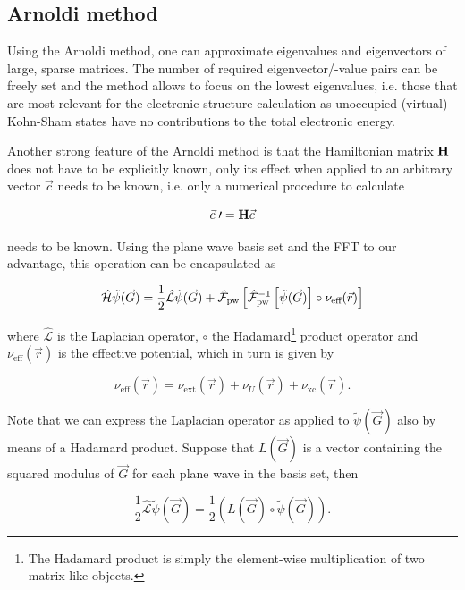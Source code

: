 %
%
%
\subsection{Arnoldi method}

Using the Arnoldi method, one can approximate eigenvalues and eigenvectors of large, sparse matrices. The number of required eigenvector/-value pairs can be freely set and the method allows to focus on the lowest eigenvalues, i.e. those that are most relevant for the electronic structure calculation as unoccupied (virtual) Kohn-Sham states have no contributions to the total electronic energy.

Another strong feature of the Arnoldi method is that the Hamiltonian matrix $\mathbf{H}$ does not have to be explicitly known, only its effect when applied to an arbitrary vector $\vec{c}$ needs to be known, i.e. only a numerical procedure to calculate

\begin{equation}
    \vec{c}\;\prime = \mathbf{H}\vec{c}
\end{equation}

needs to be known. Using the plane wave basis set and the FFT to our advantage, this operation can be encapsulated as

\begin{equation}
    \hat{\mathcal{H}}\tilde{\psi}(\vec{G}) = \frac{1}{2} \hat{\mathcal{L}}\tilde{\psi}(\vec{G}) + \hat{\mathcal{F}}_{\text{pw}}\left[\hat{\mathcal{F}}_{\text{pw}}^{-1}\left[\tilde{\psi}(\vec{G}) \right] \circ \nu_{\text{eff}}(\vec{r}) \right]
    \label{eq:appl_hamil}
\end{equation}

where $\hat{\mathcal{L}}$ is the Laplacian operator, $\circ$ the Hadamard\footnote{The Hadamard product is simply the element-wise multiplication of two matrix-like objects.} product operator and $\nu_{\text{eff}}(\vec{r})$ is the effective potential, which in turn is given by

\begin{equation}
    \nu_{\text{eff}}(\vec{r}) = \nu_{\text{ext}}(\vec{r}) + \nu_{U}(\vec{r}) + \nu_{\text{xc}}(\vec{r}).
\end{equation}

Note that we can express the Laplacian operator as applied to $\tilde{\psi}(\vec{G})$ also by means of a Hadamard product. Suppose that $L(\vec{G})$ is a vector containing the squared modulus of $\vec{G}$ for each plane wave in the basis set, then

\begin{equation}
    \frac{1}{2} \hat{\mathcal{L}}\tilde{\psi}(\vec{G}) = \frac{1}{2}\left(L(\vec{G}) \circ \tilde{\psi}(\vec{G})\right).
\end{equation}

